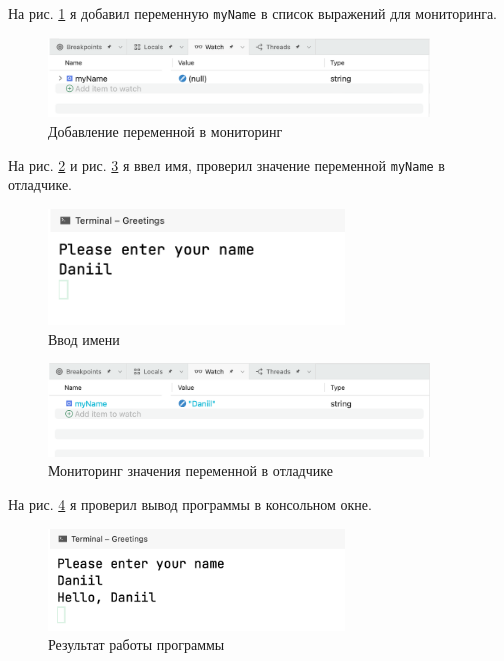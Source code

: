 \documentclass[a4paper,14pt]{extarticle}
\numberwithin{figure}{section}
\begin{document}
На рис. \ref{fig:task-3-2} я добавил переменную \texttt{myName} в список выражений для мониторинга.

\begin{figure}[H]
    \centering
    \includegraphics[width=0.9\textwidth]{images/task-3-2.png}
    \caption{Добавление переменной в мониторинг}
    \label{fig:task-3-2}
\end{figure}

На рис. \ref{fig:task-3-3} и рис. \ref{fig:task-3-4} я ввел имя, проверил значение переменной \texttt{myName} в отладчике.

\begin{figure}[H]
    \centering
    \includegraphics[width=0.7\textwidth]{images/task-3-3.png}
    \caption{Ввод имени}
    \label{fig:task-3-3}
\end{figure}

\begin{figure}[H]
    \centering
    \includegraphics[width=0.9\textwidth]{images/task-3-4.png}
    \caption{Мониторинг значения переменной в отладчике}
    \label{fig:task-3-4}
\end{figure}

На рис. \ref{fig:task-3-5} я проверил вывод программы в консольном окне.

\begin{figure}[H]
    \centering
    \includegraphics[width=0.7\textwidth]{images/task-3-5.png}
    \caption{Результат работы программы}
    \label{fig:task-3-5}
\end{figure}
\end{document}
